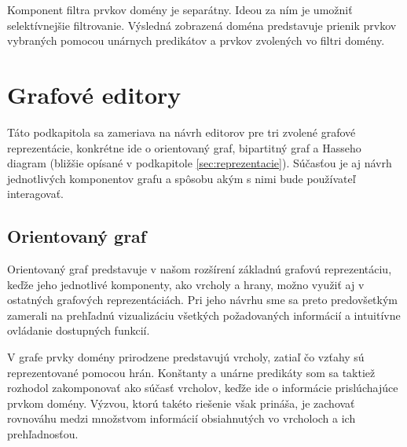 Komponent filtra prvkov domény je separátny. Ideou za ním je umožniť selektívnejšie filtrovanie. Výsledná zobrazená doména predstavuje prienik prvkov vybraných pomocou unárnych predikátov a prvkov zvolených vo filtri domény.


\section{Grafové editory}
\label{sec:plan-graph-editors}
Táto podkapitola sa zameriava na návrh editorov pre tri zvolené grafové reprezentácie, konkrétne ide o orientovaný graf, bipartitný graf a Hasseho diagram (bližšie opísané v podkapitole \ref{sec:reprezentacie}). Súčasťou je aj návrh jednotlivých komponentov grafu a spôsobu akým s nimi bude používateľ interagovať.

\subsection{Orientovaný graf}
\label{sec:basic_graph}



Orientovaný graf predstavuje v našom rozšírení základnú grafovú reprezentáciu, keďže jeho jednotlivé komponenty, ako vrcholy a hrany, možno využiť aj v ostatných grafových reprezentáciách. Pri jeho návrhu sme sa preto predovšetkým zamerali na prehľadnú vizualizáciu všetkých požadovaných informácií a intuitívne ovládanie dostupných funkcií.


V grafe prvky domény prirodzene predstavujú vrcholy, zatiaľ čo vzťahy sú reprezentované pomocou hrán. Konštanty a unárne predikáty som sa taktiež rozhodol zakomponovať ako súčasť vrcholov, keďže ide o informácie prislúchajúce prvkom domény. Výzvou, ktorú takéto riešenie však prináša, je zachovať rovnováhu medzi množstvom informácií obsiahnutých vo vrcholoch a ich prehľadnosťou.

